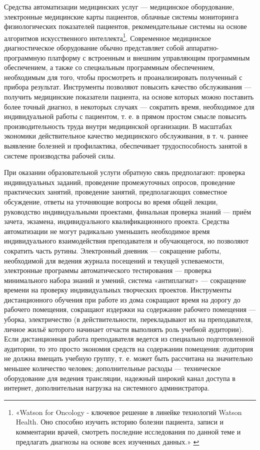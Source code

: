 \documentclass{article}
\begin{document}
Средства автоматизации медицинских услуг — медицинское оборудование, электронные медицинские карты пациентов, облачные системы мониторинга физиологических показателей пациентов, рекомендательные системы на основе алгоритмов искусственного интеллекта\footnote{«Watson for Oncology - ключевое решение в линейке технологий Watson Health. Оно способно изучить историю болезни пациента, записи и комментарии врачей, смотреть последние исследования по данной теме и предлагать диагнозы на основе всех изученных данных.» \cite{ibmWatson2022}}. Современное медицинское диагностическое оборудование обычно представляет собой аппаратно-программную платформу с встроенным и внешним управляющим программным обеспечением, а также со специальным программным обеспечением, необходимым для того, чтобы просмотреть и проанализировать полученный с прибора результат. Инструменты позволяют повысить качество обслуживания — получить медицинские показатели пациента, на основе которых можно поставить более точный диагноз, в некоторых случаях — сократить время, необходимое для индивидуальной работы с пациентом, т. е. в прямом простом смысле повысить производительность труда внутри медицинской организации. В масштабах экономики действительное качество медицинского обслуживания, в т. ч. раннее выявление болезней и профилактика, обеспечивает трудоспособность занятой в системе производства рабочей силы.

При оказании образовательной услуги обратную связь предполагают: проверка индивидуальных заданий, проведение промежуточных опросов, проведение практических занятий, проведение занятий, предполагающих совместное обсуждение, ответы на уточняющие вопросы во время общей лекции, руководство индивидуальными проектами, финальная проверка знаний — приём зачета, экзамена, индивидуального квалификационного проекта. Средства автоматизации не могут радикально уменьшить необходимое время индивидуального взаимодействия преподавателя и обучающегося, но позволяют сократить часть рутины. Электронный дневник — сокращение работы, необходимой для ведения журнала посещений и текущей успеваемости, электронные программы автоматического тестирования — проверка минимального набора знаний и умений, система «антиплагиат» — сокращение времени на проверку индивидуальных творческих проектов. Инструменты дистанционного обучения при работе из дома сокращают время на дорогу до рабочего помещения, сокращают издержки на содержание рабочего помещения — уборка, электричество (в действительности, перекладывают их на преподавателя, личное жильё которого начинает отчасти выполнять роль учебной аудитории). Если дистанционная работа преподавателя ведется из специально подготовленной аудитории, то это просто экономия средств на содержании помещения: аудитория не должна вмещать учебную группу, т. е. может быть рассчитана на значительно меньшее количество человек; дополнительные расходы — техническое оборудование для ведения трансляции, надежный широкий канал доступа в интернет, дополнительная  нагрузка на системного администратора.
\end{document}
